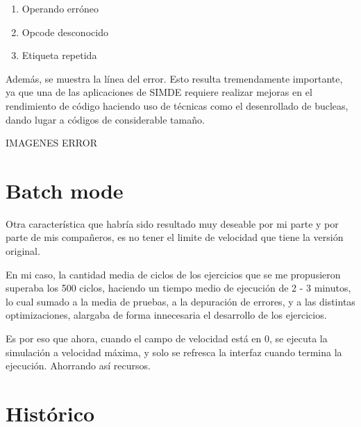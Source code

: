 \begin{enumerate}
\item Operando erróneo
\item Opcode desconocido
\item Etiqueta repetida
\end{enumerate}

Además, se muestra la línea del error. Esto resulta tremendamente importante, ya que una de las aplicaciones de SIMDE requiere realizar mejoras en el rendimiento
de código haciendo uso de técnicas como el desenrollado de bucleas, dando lugar a códigos de considerable tamaño.

IMAGENES ERROR


\section{Batch mode}
\label{6:sec3}

Otra característica que habría sido resultado muy deseable por mi parte y por parte de mis compañeros, es no tener el limite de velocidad que tiene la versión original.

En mi caso, la cantidad media de ciclos de los ejercicios que se me propusieron superaba los 500 ciclos, haciendo un tiempo medio de ejecución de 2 - 3 minutos, lo cual sumado a 
la media de pruebas, a la depuración de errores, y a las distintas optimizaciones, alargaba de forma innecesaria el desarrollo de los ejercicios.

Es por eso que ahora, cuando el campo de velocidad está en 0, se ejecuta la simulación a velocidad máxima, y solo se refresca la interfaz cuando termina la ejecución. Ahorrando así 
recursos. 

\section{Histórico}
\label{6:sec4}

